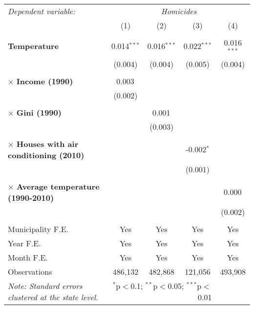 \begin{tabular}{@{\extracolsep{5pt}}lcccc}
\hline
\hline

\multicolumn{1}{l}{\textit{Dependent variable:}} &\multicolumn{4}{c}{\textit{Homicides}} \\

\cmidrule(lr){1-1}  \cmidrule(lr){2-5}

&\multicolumn{1}{c}{(1)}&\multicolumn{1}{c}{(2)}&\multicolumn{1}{c}{(3)}&\multicolumn{1}{c}{(4)}\\

\\

\textbf{Temperature} & 0.014$^{***}$ & 0.016$^{***}$ & 0.022$^{***}$ & 0.016$^{***}$ \\
& (0.004) & (0.004) & (0.005) & (0.004) \\
\\
\hspace{4pt} $\times$ \textbf{Income (1990)} & 0.003$^{}$ & & & \\
& (0.002) & & & \\
\\
\hspace{4pt} $\times$ \textbf{Gini (1990)} & & 0.001$^{}$ & & \\
& & (0.003) & & \\
\\
\hspace{4pt} $\times$ \textbf{Houses with air conditioning (2010)} & & & -0.002$^{*}$ & \\
& & & (0.001) & \\
\\
\hspace{4pt} $\times$ \textbf{Average temperature (1990-2010)} & & & & 0.000$^{}$ \\
& & & & (0.002) \\
\\
\hline
Municipality F.E. & Yes & Yes & Yes & Yes\\
Year F.E. & Yes & Yes & Yes & Yes\\
Month F.E. & Yes & Yes & Yes & Yes\\
Observations & 486,132 & 482,868 & 121,056 & 493,908 \\
\hline
\hline
\textit{Note: Standard errors clustered at the state level.} & \multicolumn{3}{r}{$^{*}$p$<$0.1; $^{**}$p$<$0.05; $^{***}$p$<$0.01} \\
\end{tabular}
